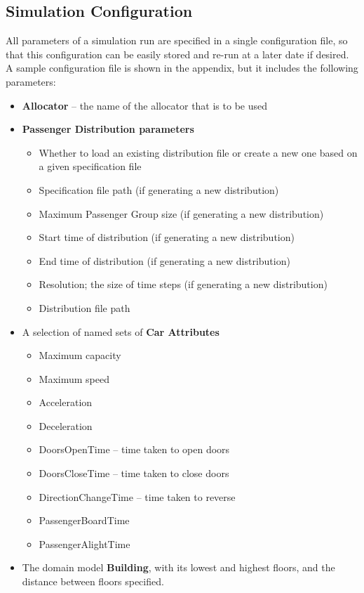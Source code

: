 \documentclass{UoYCSproject}
\begin{document}
\subsection{Simulation Configuration}
All parameters of a simulation run are specified in a single configuration file, so that this configuration can be easily stored and re-run at a later date if desired.  A sample configuration file is shown in the appendix, but it includes the following parameters:
\begin{itemize}
	\item \textbf{Allocator} -- the name of the allocator that is to be used
	\item \textbf{Passenger Distribution parameters}
	\begin{itemize}
		\item Whether to load an existing distribution file or create a new one based on a given specification file
		\item Specification file path (if generating a new distribution)
		\item Maximum Passenger Group size (if generating a new distribution)
		\item Start time of distribution (if generating a new distribution)
		\item End time of distribution (if generating a new distribution)
		\item Resolution; the size of time steps (if generating a new distribution)
		\item Distribution file path
	\end{itemize}
	\item A selection of named sets of \textbf{Car Attributes}
	\begin{itemize}
		\item Maximum capacity
		\item Maximum speed
		\item Acceleration
		\item Deceleration
		\item DoorsOpenTime -- time taken to open doors
		\item DoorsCloseTime -- time taken to close doors
		\item DirectionChangeTime -- time taken to reverse
		\item PassengerBoardTime
		\item PassengerAlightTime
	\end{itemize}
	\item The domain model \textbf{Building}, with its lowest and highest floors, and the distance between floors specified.

\end{itemize}
\end{document}
